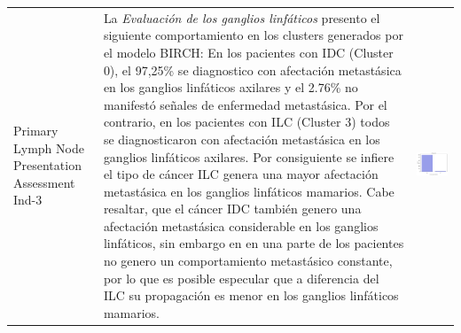 \begin{table}[htb!]
	\footnotesize
	\begin{threeparttable}
		\begin{tabular}{p{2.5cm} p{7cm} p{6.5cm}} \toprule
			Primary Lymph Node Presentation Assessment Ind-3
			& La \textit{Evaluación de los ganglios linfáticos} presento el siguiente comportamiento en los clusters generados por el modelo BIRCH: En los pacientes con IDC (Cluster 0), el 97,25\% se diagnostico con afectación metastásica en los ganglios linfáticos axilares y el 2.76\% no manifestó señales de enfermedad metastásica. Por el contrario, en los pacientes con ILC (Cluster 3) todos se diagnosticaron con afectación metastásica en los ganglios linfáticos axilares. Por consiguiente se infiere el tipo de cáncer ILC genera una mayor afectación metastásica en los ganglios linfáticos mamarios. Cabe resaltar, que el cáncer IDC también genero una afectación metastásica considerable en los ganglios linfáticos, sin embargo en en una parte de los pacientes no genero un comportamiento metastásico constante, por lo que es posible especular que a diferencia del ILC su propagación es menor en los ganglios linfáticos mamarios. 
			& 
			\begin{center}\includegraphics[width=1\linewidth]{NOTEBOOK/IMAGENES_BIRCH_CLUSTERING/6_Cluster_0_lymph_presentation}\end{center}

\end{tabular}
\end{threeparttable}
\end{table}
